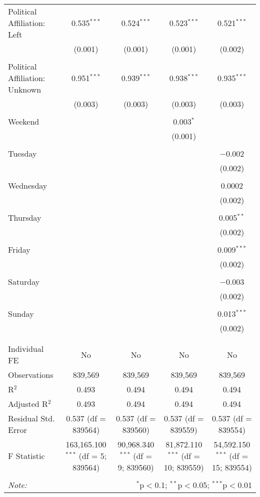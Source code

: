 \documentclass[
]{article}
\begin{document}
\begin{table}[!htbp]
{\begin{tabular}{@{\extracolsep{5pt}}lcccc}
 Political Affiliation: Left & 0.535$^{***}$ & 0.524$^{***}$ & 0.523$^{***}$ & 0.521$^{***}$ \\ 
  & (0.001) & (0.001) & (0.001) & (0.002) \\ 
  & & & & \\ 
 Political Affiliation: Unknown & 0.951$^{***}$ & 0.939$^{***}$ & 0.938$^{***}$ & 0.935$^{***}$ \\ 
  & (0.003) & (0.003) & (0.003) & (0.003) \\ 
  & & & & \\ 
 Weekend &  &  & 0.003$^{*}$ &  \\ 
  &  &  & (0.001) &  \\ 
  & & & & \\ 
 Tuesday &  &  &  & $-$0.002 \\ 
  &  &  &  & (0.002) \\ 
  & & & & \\ 
 Wednesday &  &  &  & 0.0002 \\ 
  &  &  &  & (0.002) \\ 
  & & & & \\ 
 Thursday &  &  &  & 0.005$^{**}$ \\ 
  &  &  &  & (0.002) \\ 
  & & & & \\ 
 Friday &  &  &  & 0.009$^{***}$ \\ 
  &  &  &  & (0.002) \\ 
  & & & & \\ 
 Saturday &  &  &  & $-$0.003 \\ 
  &  &  &  & (0.002) \\ 
  & & & & \\ 
 Sunday &  &  &  & 0.013$^{***}$ \\ 
  &  &  &  & (0.002) \\ 
  & & & & \\ 
\hline \\[-1.8ex] 
Individual FE & No & No & No & No \\ 
Observations & 839,569 & 839,569 & 839,569 & 839,569 \\ 
R$^{2}$ & 0.493 & 0.494 & 0.494 & 0.494 \\ 
Adjusted R$^{2}$ & 0.493 & 0.494 & 0.494 & 0.494 \\ 
Residual Std. Error & 0.537 (df = 839564) & 0.537 (df = 839560) & 0.537 (df = 839559) & 0.537 (df = 839554) \\ 
F Statistic & 163,165.100$^{***}$ (df = 5; 839564) & 90,968.340$^{***}$ (df = 9; 839560) & 81,872.110$^{***}$ (df = 10; 839559) & 54,592.150$^{***}$ (df = 15; 839554) \\ 
\hline 
\hline \\[-1.8ex] 
\textit{Note:}  & \multicolumn{4}{r}{$^{*}$p$<$0.1; $^{**}$p$<$0.05; $^{***}$p$<$0.01} \\ 
\end{tabular}
} 
\end{table} 
\newpage
\end{document}
